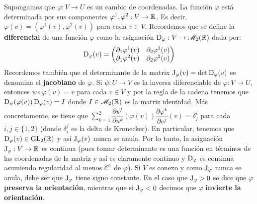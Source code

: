 Supongamos que $\varphi:V\to U$ es un cambio de coordenadas. La función $\varphi$ está determinada por sus componentes $\varphi^1,\varphi^2:V\to\mathbb{R}$. Es decir, $\varphi(v)=(\varphi^1(v),\varphi^2(v))$ para cada $v\in V$. Recordemos que se define la \textbf{diferencial} de una función $\varphi$ como la asignación $\operatorname{\mathrm{D}}_\varphi:V\to\mathscr{M}_2(\mathbb{R})$ dada por: $$\operatorname{\mathrm{D}}_\varphi(v)=\begin{pmatrix}\partial_1 \varphi^1(v) & \partial_2 \varphi^1(v)\\ \partial_1 \varphi^2(v) & \partial_2 \varphi^2(v)\end{pmatrix}$$
Recordemos también que el determinante de la matrix $\operatorname{\mathrm{J}}_\varphi(v)=\det\operatorname{\mathrm{D}}_\varphi(v)$ se denomina el \textbf{jacobiano} de $\varphi$. Si $\psi:U\to V$ es la inversa diferenciable de $\varphi:V\to U$, entonces $\psi\circ\varphi(v)=v$ para cada $v\in V$ y por la regla de la cadena tenemos que $\operatorname{\mathrm{D}}_\psi(\varphi(v)) \operatorname{\mathrm{D}}_\varphi(v)=I$ donde $I\in\mathscr{M}_2(\mathbb{R})$ es la matriz identidad. Más concretamente, se tiene que $\displaystyle\sum_{k=1}^2 \dfrac{\partial \psi^i}{\partial u^k}(\varphi(v)) \dfrac{\partial\varphi^k}{\partial v^j}(v) = \delta_{j}^{i}$ para cada $i,j\in\{1,2\}$ (donde $\delta_i^j$ es la delta de Kronecker).
En particular, tenemos que $\operatorname{\mathrm{D}}_\varphi(v)\in\operatorname{GL}_2(\mathbb{R})$ y así $\operatorname{\mathrm{J}}_\varphi(v)$ nunca se anula. Por lo tanto, la asignación $\operatorname{\mathrm{J}}_\varphi:V\to\mathbb{R}$ es continua (pues tomar determinante es una función en términos de las coordenadas de la matriz y así es claramente continuo y $\operatorname{\mathrm{D}}_\varphi$ es continua asumiendo regularidad al menos $\mathscr{C}^1$ de $\varphi$). Si $V$ es conexo y como $\operatorname{\mathrm{J}}_\varphi$ nunca se anula, debe ser que $\operatorname{\mathrm{J}}_\varphi$ tiene signo constante. En el caso que $\operatorname{\mathrm{J}}_\varphi>0$ se dice que $\varphi$ \textbf{preserva la orientación}, mientras que si $\operatorname{\mathrm{J}}_\varphi<0$ decimos que $\varphi$ \textbf{invierte la orientación}.

